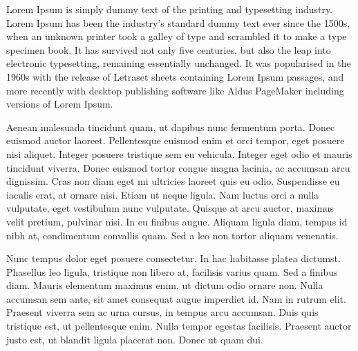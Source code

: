 \documentclass[12pt]{report}
\newcommand{\singlespaced}{\renewcommand{\baselinestretch}{1.0}\normalfont}
\numberwithin{equation}{chapter}
\begin{document}
\singlespaced
\noindent Lorem Ipsum is simply dummy text of the printing and typesetting industry. Lorem Ipsum has been the industry's standard dummy text ever since the 1500s, when an unknown printer took a galley of type and scrambled it to make a type specimen book. It has survived not only five centuries, but also the leap into electronic typesetting, remaining essentially unchanged. It was popularised in the 1960s with the release of Letraset sheets containing Lorem Ipsum passages, and more recently with desktop publishing software like Aldus PageMaker including versions of Lorem Ipsum.

\vspace*{15pt}
\noindent Aenean malesuada tincidunt quam, ut dapibus nunc fermentum porta. Donec euismod auctor laoreet. Pellentesque euismod enim et orci tempor, eget posuere nisi aliquet. Integer posuere tristique sem eu vehicula. Integer eget odio et mauris tincidunt viverra. Donec euismod tortor congue magna lacinia, ac accumsan arcu dignissim. Cras non diam eget mi ultricies laoreet quis eu odio. Suspendisse eu iaculis erat, at ornare nisi. Etiam ut neque ligula. Nam luctus orci a nulla vulputate, eget vestibulum nunc vulputate. Quisque at arcu auctor, maximus velit pretium, pulvinar nisi. In eu finibus augue. Aliquam ligula diam, tempus id nibh at, condimentum convallis quam. Sed a leo non tortor aliquam venenatis.

\vspace*{15pt}
\noindent Nunc tempus dolor eget posuere consectetur. In hac habitasse platea dictumst. Phasellus leo ligula, tristique non libero at, facilisis varius quam. Sed a finibus diam. Mauris elementum maximus enim, ut dictum odio ornare non. Nulla accumsan sem ante, sit amet consequat augue imperdiet id. Nam in rutrum elit. Praesent viverra sem ac urna cursus, in tempus arcu accumsan. Duis quis tristique est, ut pellentesque enim. Nulla tempor egestas facilisis. Praesent auctor justo est, ut blandit ligula placerat non. Donec ut quam dui.  


\vspace*{\fill}

\newpage

\singlespaced
\tableofcontents


\newpage

\singlespaced
\listoftables


\newpage

\singlespaced
\listoffigures


\newpage
\end{document}
